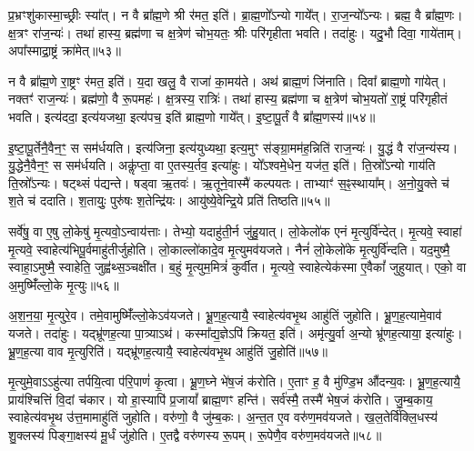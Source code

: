 प्र॒भ्रꣳशु॑कास्मा॒च्छ्रीः स्या᳚त्।
न वै ब्रा᳚ह्म॒णे श्री र॑मत॒ इति॑।
ब्रा॒ह्म॒णो᳚\-ऽन्यो गाये᳚त्।
रा॒ज॒न्यो᳚\-ऽन्यः।
ब्रह्म॒ वै ब्रा᳚ह्म॒णः।
क्ष॒त्रꣳ रा॑ज॒न्यः॑।
तथा॑ हास्य॒ ब्रह्म॑णा च क्ष॒त्रेण॑ चोभ॒यतः॒ श्रीः परि॑गृहीता भवति।
तदा॑हुः।
यदु॒भौ दिवा॒ गाये॑ताम्।
अपा᳚स्माद्रा॒ष्ट्रं क्रा॑मेत्॥५३॥\ip

न वै ब्रा᳚ह्म॒णे रा॒ष्ट्रꣳ र॑मत॒ इति॑।
य॒दा खलु॒ वै राजा॑ का॒मय॑ते।
अथ॑ ब्राह्म॒णं जि॑नाति।
दिवा᳚ ब्राह्म॒णो गा॑येत्।
नक्तꣳ॑ राज॒न्यः॑।
ब्रह्म॑णो॒ वै रू॒पमहः॑।
क्ष॒त्रस्य॒ रात्रिः॑।
तथा॑ हास्य॒ ब्रह्म॑णा च क्ष॒त्रेण॑ चोभ॒यतो॑ रा॒ष्ट्रं परि॑गृहीतं भवति।
इत्य॑ददा॒ इत्य॑यजथा॒ इत्य॑पच॒ इति॑ ब्राह्म॒णो गाये᳚त्।
इ॒ष्टा॒पू॒र्तं वै ब्रा᳚ह्म॒णस्य॑॥५४॥\ip

इ॒ष्टा॒पू॒र्तेनै॒वैन॒ꣳ॒ स सम॑र्धयति।
इत्य॑जिना॒ इत्य॑युध्यथा॒ इत्य॒मुꣳ स॑ङ्ग्रा॒मम॑ह॒न्निति॑ राज॒न्यः॑।
यु॒द्धं वै रा॑ज॒न्य॑स्य।
यु॒द्धेनै॒वैन॒ꣳ॒ स सम॑र्धयति।
अकॢ॑प्ता॒ वा ए॒तस्य॒र्तव॒ इत्या॑हुः।
यो᳚ऽश्वमे॒धेन॒ यज॑त॒ इति॑।
ति॒स्रो᳚\-ऽन्यो गाय॑ति ति॒स्रो᳚\-ऽन्यः।
षट्थ्सं प॑द्यन्ते।
षड्वा ऋ॒तवः॑।
ऋ॒तूने॒वास्मै॑ कल्पयतः।
ताभ्याꣳ॑ स॒ꣴ॒स्थाया᳚म्।
अ॒नो॒यु॒क्ते च॑ श॒ते च॑ ददाति।
श॒तायुः॒ पुरु॑षः श॒तेन्द्रि॑यः।
आयु॑ष्ये॒वेन्द्रि॒ये प्रति॑ तिष्ठति॥५५॥\ip\anuvakamend[गाये॑ताङ्क्रामेद्ब्राह्म॒णस्य॑ कल्पयतश्च॒त्वारि॑ च]

सर्वे॑षु॒ वा ए॒षु लो॒केषु॑ मृ॒त्यवो॒\-ऽन्वाय॑त्ताः।
तेभ्यो॒ यदाहु॑ती॒र्न जु॑हु॒यात्।
लो॒केलो॑क एनं मृ॒त्युर्वि॑न्देत्।
मृ॒त्यवे॒ स्वाहा॑ मृ॒त्यवे॒ स्वाहेत्य॑भिपू॒र्वमाहु॑तीर्जुहोति।
लो॒काल्लो॑कादे॒व मृ॒त्युमव॑यजते।
नैनं॑ लो॒केलो॑के मृ॒त्युर्वि॑न्दति।
यद॒मुष्मै॒ स्वाहा॒\-ऽमुष्मै॒ स्वाहेति॒ जुह्व॑थ्स॒ञ्चक्षी॑त।
ब॒हुं मृ॒त्युम॒मित्रं॑ कुर्वीत।
मृ॒त्यवे॒ स्वाहेत्येक॑स्मा ए॒वैकां᳚ जुहुयात्।
एको॒ वा अ॒मुष्मिँ॑ल्लो॒के मृ॒त्युः॥५६॥\ip

अ॒श॒न॒या॒ मृ॒त्युरे॒व।
तमे॒वामुष्मिँ॑ल्लो॒के\-ऽव॑यजते।
भ्रू॒ण॒ह॒त्यायै॒ स्वाहेत्य॑वभृ॒थ आहु॑तिं जुहोति।
भ्रू॒ण॒ह॒त्यामे॒वाव॑ यजते।
तदा॑हुः।
यद्भ्रू॑णह॒त्या पा॒त्र्याऽथ॑।
कस्मा᳚द्य॒ज्ञेऽपि॑ क्रियत॒ इति॑।
अमृ॑त्यु॒र्वा अ॒न्यो भ्रू॑णह॒त्याया॒ इत्या॑हुः।
भ्रू॒ण॒ह॒त्या वाव मृ॒त्युरिति॑।
यद्भ्रू॑णह॒त्यायै॒ स्वाहेत्य॑वभृ॒थ आहु॑तिं जु॒होति॑॥५७॥\ip

मृ॒त्युमे॒वाऽऽहु॑त्या तर्पयि॒त्वा प॑रि॒पाणं॑ कृ॒त्वा।
भ्रू॒ण॒घ्ने भे॑ष॒जं क॑रोति।
ए॒ताꣳ ह॒ वै मु॑ण्डि॒भ औ॑दन्य॒वः।
भ्रू॒ण॒ह॒त्यायै॒ प्राय॑श्चित्तिं वि॒दां च॑कार।
यो हा॒स्यापि॑ प्र॒जायां᳚ ब्राह्म॒णꣳ हन्ति॑।
सर्व॑स्मै॒ तस्मै॑ भेष॒जं क॑रोति।
जु॒म्ब॒काय॒ स्वाहेत्य॑वभृ॒थ उ॑त्त॒मामाहु॑तिं जुहोति।
वरु॑णो॒ वै जु॑म्ब॒कः।
अ॒न्त॒त ए॒व वरु॑ण॒मव॑यजते।
ख॒ल॒तेर्वि॑क्लि॒धस्य॑ शु॒क्लस्य॑ पिङ्गा॒क्षस्य॑ मू॒र्धं जु॑होति।
ए॒तद्वै वरु॑णस्य रू॒पम्।
रू॒पेणै॒व वरु॑ण॒मव॑यजते॥५८॥\ip\anuvakamend[लो॒के मृ॒त्युर्जु॒होति॑ मू॒र्धं जु॑होति॒ द्वे च॑]

